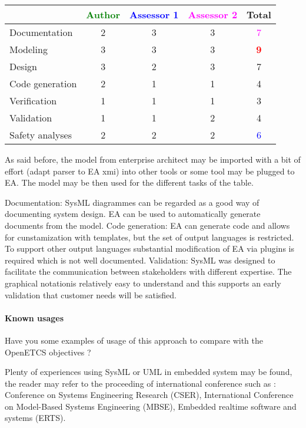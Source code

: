 \begin{tabular}{|l | c | c | c | c|}
\hline
& \textcolor{green}{Author} & \textcolor{blue}{Assessor 1} & \textcolor{magenta}{Assessor 2} & Total \\
\hline 
Documentation & 2     & 3     & 3     & \textcolor{magenta}{7} \\
\hline
Modeling & 3     & 3     & 3     & \textcolor{red}{\textbf{9}} \\
\hline
Design & 3     & 2     & 3     &  7 \\
\hline
Code generation &2 & 1     & 1     & 4     \\
\hline
Verification & 1     & 1     & 1     & 3     \\
\hline
Validation & 1     & 1     & 2     & 4     \\
\hline
Safety analyses & 2     & 2     & 2     & \textcolor{blue}{6} \\
\hline
\end{tabular}
\begin{author_comment}
As said before, the model from enterprise architect may be imported
with a bit of effort (adapt parser to EA xmi) into other tools or some
tool may be plugged to EA. The model may be then used for the
different tasks of the table.
\end{author_comment}
\begin{assessor2}
Documentation: SysML diagrammes can be regarded as a good way of documenting system design. EA can be used to automatically generate documents from the model.
Code generation: EA can generate code and allows for cunstamization with templates, but the set of output languages is restricted. To support other output languages substantial modification of EA via plugins is required which is not well documented.
Validation: SysML was designed to facilitate the communication between stakeholders with different expertise. The graphical notationis relatively easy to understand and this supports an early validation that customer needs will be satisfied.
\end{assessor2}


\paragraph{Known usages} Have you some examples of usage of this
approach to  compare with the OpenETCS objectives ?

Plenty of experiences using SysML or UML in embedded system may be
found, the reader may refer to the proceeding of international
conference such as : Conference on Systems Engineering
Research (CSER), International Conference on Model-Based Systems Engineering
(MBSE), Embedded realtime software and systems (ERTS).
 

